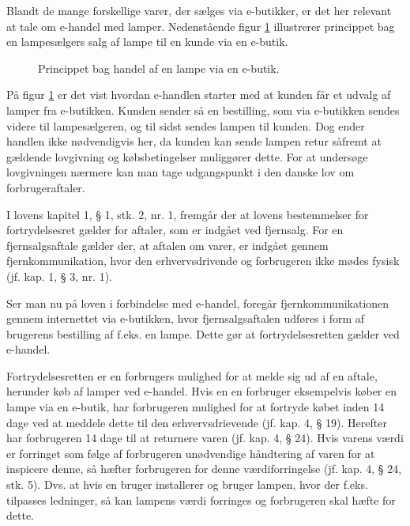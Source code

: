 Blandt de mange forskellige varer, der sælges via e-butikker, er det her relevant at tale om e-handel med lamper. Nedenstående figur \ref{fig:e_handel_med_lamper} illustrerer princippet bag en lampesælgers salg af lampe til en kunde via en e-butik.
\begin{figure}[H]
	\centering
	\def\svgwidth{\columnwidth}
	
	\caption{Princippet bag handel af en lampe via en e-butik.}
    \label{fig:e_handel_med_lamper}
\end{figure}

På figur \ref{fig:e_handel_med_lamper} er det vist hvordan e-handlen starter med at kunden får et udvalg af lamper fra e-butikken. Kunden sender så en bestilling, som via e-butikken sendes videre til lampesælgeren, og til sidst sendes lampen til kunden. Dog ender handlen ikke nødvendigvis her, da kunden kan sende lampen retur såfremt at gældende lovgivning og købsbetingelser muliggører dette. For at undersøge lovgivningen nærmere kan man tage udgangspunkt i den danske lov om forbrugeraftaler\cite{retsinformationen}.

I lovens kapitel 1, § 1, stk. 2, nr. 1, fremgår der at lovens bestemmelser for fortrydelsesret gælder for aftaler, som er indgået ved fjernsalg. For en  fjernsalgsaftale gælder der, at aftalen om varer, er indgået gennem fjernkommunikation, hvor den erhvervsdrivende og forbrugeren ikke mødes fysisk (jf. kap. 1, § 3, nr. 1).

Ser man nu på loven i forbindelse med e-handel, foregår fjernkommunikationen gennem internettet via e-butikken, hvor fjernsalgsaftalen udføres i form af brugerens bestilling af f.eks. en lampe. Dette gør at fortrydelsesretten gælder ved e-handel.

Fortrydelsesretten er en forbrugers mulighed for at melde sig ud af en aftale, herunder køb af lamper ved e-handel. Hvis en en forbruger eksempelvis køber en lampe via en e-butik, har forbrugeren mulighed for at fortryde købet inden 14 dage ved at meddele dette til den erhvervsdrievende (jf. kap. 4, § 19). Herefter har forbrugeren 14 dage til at returnere varen (jf. kap. 4, § 24). Hvis varens værdi er forringet som følge af forbrugeren unødvendige håndtering af varen for at inspicere denne, så hæfter forbrugeren for denne værdiforringelse (jf. kap. 4, § 24, stk. 5). Dvs. at hvis en bruger installerer og bruger lampen, hvor der f.eks. tilpasses ledninger, så kan lampens værdi forringes og forbrugeren skal hæfte for dette. 







